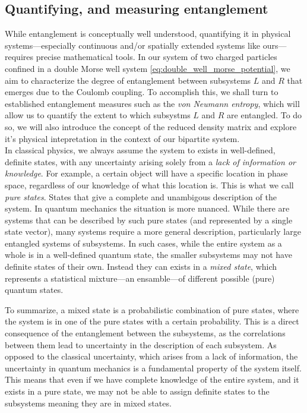 \documentclass{subfiles}
\begin{document}
\subsection{Quantifying, and measuring entanglement}
While entanglement is conceptually well understood, quantifying it in physical systems—especially continuous and/or spatially extended systems like ours—requires precise mathematical tools. In our system of two charged particles confined in a double Morse well system \eqref{eq:double_well_morse_potential}, we aim to characterize the degree of entanglement between subsystems $L$ and $R$ that emerges due to the Coulomb coupling. To accomplish this, we shall turn to established entanglement measures such as the \emph{von Neumann entropy}, which will allow us to quantify the extent to which subsystms $L$ and $R$ are entangled. To do so, we will also introduce the concept of the reduced density matrix and explore it's physical intepretation in the context of our bipartite system. \\

In classical physics, we always assume the system to exists in well-defined, definite states, with any uncertainty arising solely from a \emph{lack of information or knowledge}. For example, a certain object will have a specific location in phase space, regardless of our knowledge of what this location is. This is what we call \emph{pure states}. States that give a complete and unambigous description of the system. In quantum mechanics the situation is more nuanced. While there are systems that can be described by such pure states (and represented by a single state vector), many systems require a more general description, particularly large entangled systems of subsystems. In such cases, while the entire system as a whole is in a well-defined quantum state, the smaller subsystems may not have definite states of their own. Instead they can exists in a \emph{mixed state}, which represents a statistical mixture—an ensamble—of different possible (pure) quantum states.

To summarize, a mixed state is a probabilistic combination of pure states, where the system is in one of the pure states with a certain probability. This is a direct consequence of the entanglement between the subsystems, as the correlations between them lead to uncertainty in the description of each subsystem. As opposed to the classical uncertainty, which arises from a lack of information, the uncertainty in quantum mechanics is a fundamental property of the system itself. This means that even if we have complete knowledge of the entire system, and it exists in a pure state, we may not be able to assign definite states to the subsystems meaning they are in mixed states\cite{sakurai1986modern, berera2021quantum, griffiths2018introduction}. 
\\ 
\end{document}
